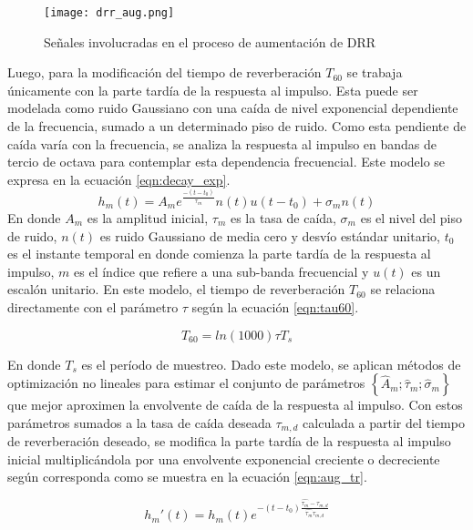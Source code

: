 \begin{figure}[H]
	\centering{}
	\texttt{[image: drr\_aug.png]}
	\caption{Señales involucradas en el proceso de aumentación de DRR}
	\label{fig:drr_aug}
\end{figure}

Luego, para la modificación del tiempo de reverberación $T_{60}$ se trabaja únicamente con la parte tardía de la respuesta al impulso. Esta puede ser modelada como ruido Gaussiano con una caída de nivel exponencial dependiente de la frecuencia, sumado a un determinado piso de ruido. Como esta pendiente de caída varía con la frecuencia, se analiza la respuesta al impulso en bandas de tercio de octava para contemplar esta dependencia frecuencial. Este modelo se expresa en la ecuación \ref{eqn:decay_exp}. 
\begin{equation}
\label{eqn:decay_exp}
	h_{m}(t) = A_{m} e^{\frac{-(t-t_{0})}{\tau_{m}}}n(t)u(t-t_{0})+\sigma_{m}n(t)
\end{equation} 
En donde $A_{m}$ es la amplitud inicial, $\tau_{m}$ es la tasa de caída, $\sigma_{m}$ es el nivel del piso de ruido, $n(t)$ es ruido Gaussiano de media cero y desvío estándar unitario, $t_{0}$ es el instante temporal en donde comienza la parte tardía de la respuesta al impulso, $m$ es el índice que refiere a una sub-banda frecuencial y $u(t)$ es un escalón unitario. En este modelo, el tiempo de reverberación $T_{60}$ se relaciona directamente con el parámetro $\tau$ según la ecuación \ref{eqn:tau60}.

\begin{equation}
\label{eqn:tau60}
	T_{60} = ln(1000)\tau T_{s}
\end{equation}

En donde $T_{s}$ es el período de muestreo. Dado este modelo, se aplican métodos de optimización no lineales para estimar el conjunto de parámetros $\left \{ \hat{A}_{m}; \hat{\tau}_{m}; \hat{\sigma}_{m} \right \}$ que mejor aproximen la envolvente de caída de la respuesta al impulso. Con estos parámetros sumados a la tasa de caída deseada $\tau_{m,d}$ calculada a partir del tiempo de reverberación deseado, se modifica la parte tardía de la respuesta al impulso inicial multiplicándola por una envolvente exponencial creciente o decreciente según corresponda como se muestra en la ecuación  \ref{eqn:aug_tr}.

\begin{equation}
\label{eqn:aug_tr}
	{h_{m}}'(t) = h_{m}(t) e^{-(t-t_{0})\frac{\hat{\tau_{m}}-\tau_{m,d}}{\hat{\tau_{m}}\tau_{m,d}}}
\end{equation}

